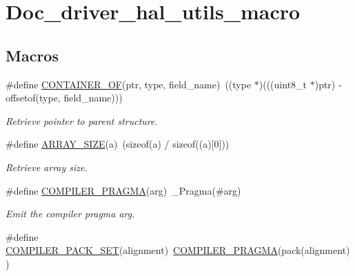 \hypertarget{group__doc__driver__hal__utils__macro}{}\section{Doc\+\_\+driver\+\_\+hal\+\_\+utils\+\_\+macro}
\label{group__doc__driver__hal__utils__macro}
\subsection*{Macros}
\begin{DoxyCompactItemize}
\item 
\mbox{\label{group__doc__driver__hal__utils__macro_gae5f8e0a04e100a3953e38a3c7bdbc4f4}} 
\#define \hyperlink{group__doc__driver__hal__utils__macro_gae5f8e0a04e100a3953e38a3c7bdbc4f4}{C\+O\+N\+T\+A\+I\+N\+E\+R\+\_\+\+OF}(ptr,  type,  field\+\_\+name)~((type $\ast$)(((uint8\+\_\+t $\ast$)ptr) -\/ offsetof(type, field\+\_\+name)))
\begin{DoxyCompactList}\small\item\em Retrieve pointer to parent structure. \end{DoxyCompactList}\item 
\mbox{\label{group__doc__driver__hal__utils__macro_ga25f003de16c08a4888b69f619d70f427}} 
\#define \hyperlink{group__doc__driver__hal__utils__macro_ga25f003de16c08a4888b69f619d70f427}{A\+R\+R\+A\+Y\+\_\+\+S\+I\+ZE}(a)~(sizeof(a) / sizeof((a)\mbox{[}0\mbox{]}))
\begin{DoxyCompactList}\small\item\em Retrieve array size. \end{DoxyCompactList}\item 
\#define \hyperlink{group__doc__driver__hal__utils__macro_ga85a3ab5701281268521f109ed0078668}{C\+O\+M\+P\+I\+L\+E\+R\+\_\+\+P\+R\+A\+G\+MA}(arg)~\+\_\+\+Pragma(\#arg)
\begin{DoxyCompactList}\small\item\em Emit the compiler pragma {\itshape arg}. \end{DoxyCompactList}\item 
\mbox{\label{group__doc__driver__hal__utils__macro_gae2c02ff865ca6538b4b1bddbf2a6876c}} 
\#define \hyperlink{group__doc__driver__hal__utils__macro_gae2c02ff865ca6538b4b1bddbf2a6876c}{C\+O\+M\+P\+I\+L\+E\+R\+\_\+\+P\+A\+C\+K\+\_\+\+S\+ET}(alignment)~\hyperlink{group__doc__driver__hal__utils__macro_ga85a3ab5701281268521f109ed0078668}{C\+O\+M\+P\+I\+L\+E\+R\+\_\+\+P\+R\+A\+G\+MA}(pack(alignment))

\end{DoxyCompactItemize}
